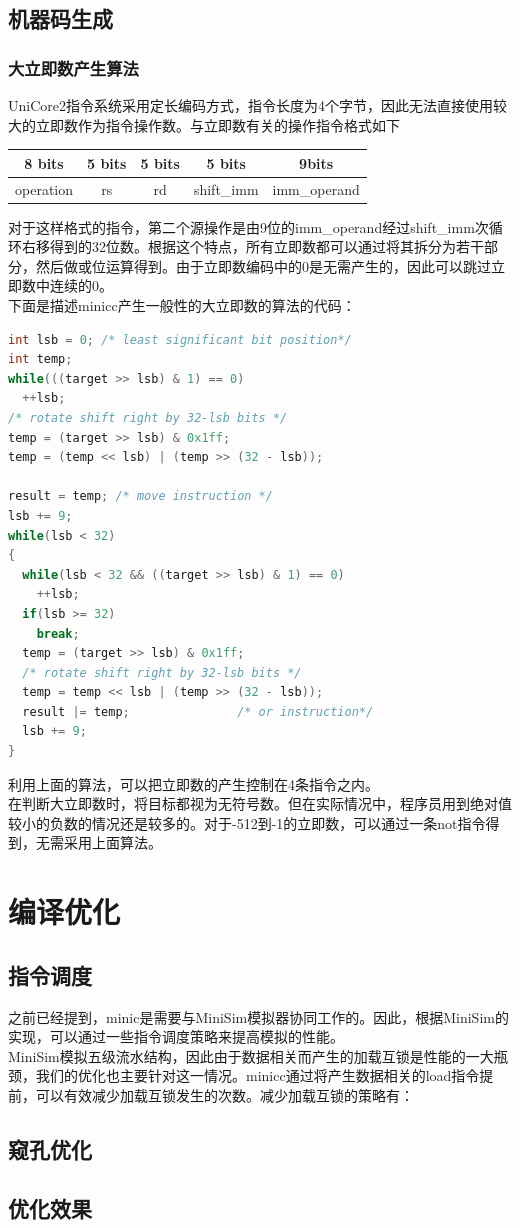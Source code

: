 \documentclass[12pt,a4paper,Flow]{report}
\begin{document}
\section{机器码生成}
\subsection{大立即数产生算法}
UniCore2指令系统采用定长编码方式，指令长度为4个字节，因此无法直接使用较大的立即数作为指令操作数。与立即数有关的操作指令格式如下
\begin{center}
  \begin{tabular}{ccccc}
    8 bits & 5 bits & 5 bits & 5 bits & 9bits \\
    \hline
    operation \cellcolor{rgb:red,2;green,1;yellow,1}& rs\cellcolor{rgb:red,0;green,1;yellow,1} & rd\cellcolor{rgb:red,0;green,0;blue,1} & shift\_imm \cellcolor[gray]{.9}& imm\_operand \cellcolor{rgb:red,5;green,0;yellow,0}\\
    \hline
  \end{tabular}
\end{center}
对于这样格式的指令，第二个源操作是由9位的imm\_operand经过shift\_imm次循环右移得到的32位数。根据这个特点，所有立即数都可以通过将其拆分为若干部分，然后做或位运算得到。由于立即数编码中的0是无需产生的，因此可以跳过立即数中连续的0。\\
\indent 下面是描述minicc产生一般性的大立即数的算法的代码：
\begin{lstlisting}[language=c]
int lsb = 0; /* least significant bit position*/
int temp;
while(((target >> lsb) & 1) == 0)
  ++lsb;
/* rotate shift right by 32-lsb bits */
temp = (target >> lsb) & 0x1ff;
temp = (temp << lsb) | (temp >> (32 - lsb));

result = temp; /* move instruction */
lsb += 9;
while(lsb < 32)
{
  while(lsb < 32 && ((target >> lsb) & 1) == 0)
    ++lsb;
  if(lsb >= 32)
    break;
  temp = (target >> lsb) & 0x1ff;
  /* rotate shift right by 32-lsb bits */
  temp = temp << lsb | (temp >> (32 - lsb));
  result |= temp;               /* or instruction*/
  lsb += 9;
}
\end{lstlisting}
利用上面的算法，可以把立即数的产生控制在4条指令之内。\\
\indent 在判断大立即数时，将目标都视为无符号数。但在实际情况中，程序员用到绝对值较小的负数的情况还是较多的。对于-512到-1的立即数，可以通过一条not指令得到，无需采用上面算法。
\chapter{编译优化}
\section{指令调度}
之前已经提到，minic是需要与MiniSim模拟器协同工作的。因此，根据MiniSim的实现，可以通过一些指令调度策略来提高模拟的性能。\\
\indent MiniSim模拟五级流水结构，因此由于数据相关而产生的加载互锁是性能的一大瓶颈，我们的优化也主要针对这一情况。minicc通过将产生数据相关的load指令提前，可以有效减少加载互锁发生的次数。减少加载互锁的策略有：
\section{窥孔优化}
\section{优化效果}
\end{document}
